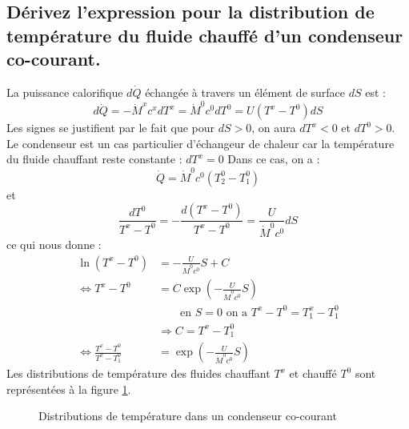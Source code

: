 \subsection{Dérivez l'expression pour la distribution de température du fluide chauffé d'un condenseur co-courant.}
La puissance calorifique $d\dot{Q}$ échangée à travers un élément de surface $dS$ est :
\begin{equation} d\dot{Q} = -\dot{M}^xc^xdT^x = \dot{M}^0c^0dT^0 = U(T^x-T^0)dS \end{equation}
Les signes se justifient par le fait que pour $dS > 0$, on aura $dT^x < 0$ et $dT^0 > 0$. Le condenseur est un cas particulier d'échangeur de chaleur car la température du fluide chauffant reste constante : $dT^x = 0$
Dans ce cas, on a :
\begin{equation} \dot{Q} = \dot{M}^0c^0(T_2^0 - T_1^0) \end{equation}
et
\begin{equation} \frac{dT^0}{T^x-T^0} = -\frac{d(T^x-T^0)}{T^x-T^0} = \frac{U}{\dot{M}^0c^0}dS \end{equation}
ce qui nous donne :
\begin{align} \ln({T^x-T^0}) &= -\frac{U}{\dot{M}^0c^0}S + C\\
			\Leftrightarrow T^x-T^0 &= C\exp\left(-\frac{U}{\dot{M}^0c^0}S\right) \\
			& \qquad\text{en } S = 0 \text{ on a } T^x-T^0 = T_1^x-T_1^0 \\
			&\Rightarrow C = T^x-T_1^0 \\
			\Leftrightarrow\frac{T^x-T^0}{T^x-T_1^0} &= \exp\left(-\frac{U}{\dot{M}^0c^0}S\right)
\end{align}
Les distributions de température des fluides chauffant $T^x$ et chauffé $T^0$ sont représentées à la figure \ref{fig:q3_10}.
\begin{figure}[p]\centering
    \caption{Distributions de température dans un condenseur co-courant}
    \label{fig:q3_10}
\end{figure}

